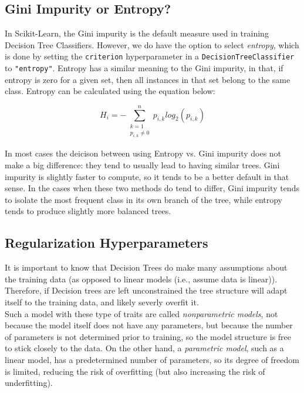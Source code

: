 \subsection{Gini Impurity or Entropy?}

In Scikit-Learn, the Gini impurity is the default measure used in training Decision Tree Classifiers. However, we do have the option to select
\textit{entropy}, which is done by setting the \texttt{criterion} hyperparameter in a \texttt{DecisionTreeClassifier}
to \texttt{"entropy"}. Entropy has a similar meaning to the Gini impurity, in that, if entropy is zero for a given set, then all
instances in that set belong to the same class. Entropy can be calculated using the equation below:

$$H_{i} = - \sum_{\substack{k=1 \\ p_{i,k} \neq 0}}^{n} p_{i,k} log_{2} (p_{i,k})$$

\noindent
In most cases the deicison between using Entropy vs. Gini impurity does not make a big difference: they tend to usually lead to having similar
trees. Gini impurity is slightly faster to compute, so it tends to be a better default in that sense. In the cases when these two methods do tend
to differ, Gini impurity tends to isolate the most frequent class in its own branch of the tree, while entropy tends to produce slightly more
balanced trees.

\subsection{Regularization Hyperparameters}

It is important to know that Decision Trees do make many assumptions about the training data (as opposed to linear models (i.e., assume data 
is linear)). Therefore, if Decision trees are left unconstrained the tree structure will adapt itself to the training data, and likely severly
overfit it. \\

\noindent
Such a model with these type of traits are called \textit{nonparametric models}, not because the model itself does not have any parameters, but
because the number of parameters is not determined prior to training, so the model structure is free to stick closely to the data. On the other
hand, a \textit{parametric model}, such as a linear model, has a predetermined number of parameters, so its degree of freedom is limited, 
reducing the risk of overfitting (but also increasing the risk of underfitting). \\

